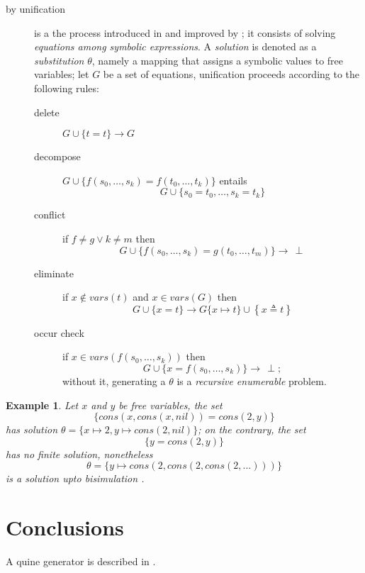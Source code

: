 \documentclass[a4paper,12pt]{article}
\newtheorem{example}[theorem]{Example}
\begin{document}
\begin{description}
\item[by unification] is a the process introduced in \citep{robinson_unif} and
improved by \citep{Martelli:1982:EUA:357162.357169}; it consists of solving
\textit{equations among symbolic expressions}. A \textit{solution} is denoted
as a \textit{substitution} $\theta$, namely a mapping that assigns a symbolic
values to free variables; let $G$ be a set of equations, unification proceeds
according to the following rules:
\begin{description}
\item[delete] $G \cup \lbrace t = t \rbrace \rightarrow G$
\item[decompose] $G \cup \lbrace f(s_{0}, \ldots, s_{k}) = f(t_{0}, \ldots, t_{k})\rbrace$ entails
$$G \cup \lbrace s_{0}=t_{0},\ldots, s_{k}=t_{k} \rbrace$$
\item[conflict] if $f\neq g \vee k\neq m$ then $$G \cup \lbrace f(s_{0}, \ldots, s_{k}) = g(t_{0}, \ldots, t_{m})\rbrace \rightarrow \,\perp$$
\item[eliminate] if $x \not\in vars(t)$ and $x \in vars(G)$ then $$G \cup \lbrace x = t\rbrace \rightarrow G\lbrace x \mapsto t\rbrace \cup \left\lbrace x \triangleq t\right\rbrace $$
\item[occur check] if $x \in vars(f(s_{0},\ldots,s_{k}))$ then $$G \cup \lbrace x = f(s_{0}, \ldots, s_{k})\rbrace \rightarrow \,\perp;$$
without it, generating a $\theta$ is a
\emph{recursive enumerable} problem.
\end{description}

\end{description}

\begin{example}
Let $x$ and $y$ be free variables, the set
$$\lbrace cons(x,cons(x,nil)) = cons(2,y)\rbrace$$
has solution $\theta = \lbrace x \mapsto 2, y \mapsto cons(2,nil) \rbrace$;
on the contrary, the set
$$ \lbrace y = cons(2,y) \rbrace $$
has no \textit{finite} solution, nonetheless
$$\theta = \lbrace y \mapsto cons(2,cons(2,cons(2,...))) \rbrace$$
is a solution upto \textit{bisimulation}
\citep{10.1007/BFb0017309, DBLP:books/daglib/0067019}.
\end{example}


\section{Conclusions}

A quine generator is described in \citep{Byrd:2012:MLU:2661103.2661105}.



\end{document}
